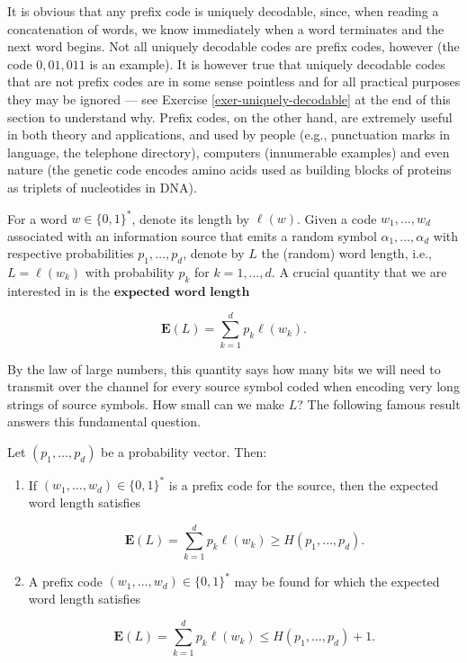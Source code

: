 \noindent It is obvious that any prefix code is uniquely
decodable, since, when reading a concatenation of
words, we know immediately when a word terminates and
the next word begins. Not all uniquely decodable codes
are prefix codes, however (the code $0, 01, 011$ is
an example). It is however true that uniquely
decodable codes that are not prefix codes are in some
sense pointless and for all practical purposes they
may be ignored --- see Exercise
\ref{exer-uniquely-decodable} at the end of this section
to understand why. Prefix codes, on the other hand,
are extremely useful in both theory and applications,
and used by people (e.g., punctuation marks in
language, the telephone directory), computers
(innumerable examples) and even nature (the genetic
code encodes amino acids used as building blocks of
proteins as triplets of nucleotides in DNA).

For a word $w\in \{0,1\}^*$, denote its length by
$\ell(w)$. Given a code $w_1,\ldots,w_d$ associated
with an information source that emits a random symbol
$\alpha_1,\ldots,\alpha_d$ with respective
probabilities $p_1,\ldots,p_d$, denote by $L$ the
(random) word length, i.e., $L=\ell(w_k)$ with
probability $p_k$ for $k=1,\ldots,d$. A crucial
quantity that we are interested in is the
$\textbf{expected word length}$

\[
\mathbf{E}(L) = \sum_{k=1}^d p_k \ell(w_k).
\]

\noindent By the law of large numbers, this quantity says how
many bits we will need to transmit over the channel
for every source symbol coded when encoding very long
strings of source symbols. How small can we make $L$?
The following famous result answers this fundamental
question.

\begin{thm}
Let $(p_1,\ldots,p_d)$ be a probability vector. Then:

\begin{enumerate}[label=\arabic*.]
\item If $(w_1,\ldots,w_d) \in \{0,1\}^*$ is a prefix code
for the source, then the expected word length
satisfies

\[
\mathbf{E}(L) = \sum_{k=1}^d p_k \ell(w_k) \ge H(p_1,\ldots, p_d).
\]

\item A prefix code $(w_1,\ldots,w_d) \in \{0,1\}^*$ may be
found for which the expected word length satisfies

\[
\mathbf{E}(L) = \sum_{k=1}^d p_k \ell(w_k) \le H(p_1,\ldots, p_d) + 1.
\]
\end{enumerate}

\end{thm}


